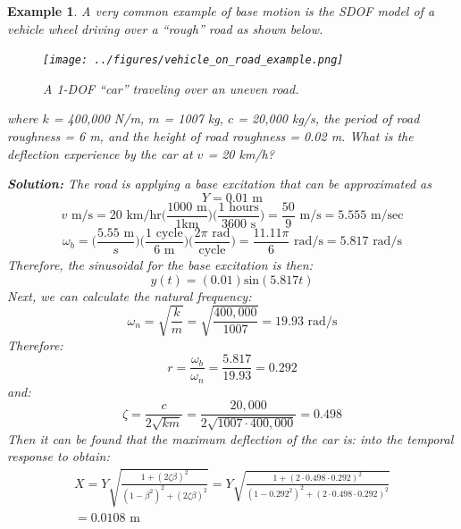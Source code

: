 \documentclass[12pt,letter]{article}
\newtheorem{ex}{Example}
\numberwithin{ex}{section} %
\newenvironment{example}{\begin{mdframed}[middlelinewidth=0.5mm]\begin{ex}\normalfont}{\end{ex}\end{mdframed}}
\numberwithin{re}{section} %
\numberwithin{pr}{section} %
\begin{document}
				\begin{example}
	
					A very common example of base motion is the SDOF model of a vehicle wheel driving over a ``rough'' road as shown below. 
					\begin{figure}[H]
						\centering
						\texttt{[image: ../figures/vehicle\_on\_road\_example.png]}
						\caption{A 1-DOF ``car'' traveling over an uneven road.}
					\end{figure}				
					\noindent where $k$ = 400,000 N/m, $m$ = 1007 kg, $c$ = 20,000 kg/s, the period of road roughness = 6 m, and the height of road roughness = 0.02 m. What is the deflection experience by the car at $v$ = 20 km/h?
					
					\noindent\textbf{Solution:} The road is applying a base excitation that can be approximated as 
					\begin{equation}
						Y = 0.01 \text{ m}
					\end{equation} 				
					\begin{equation}
						v \text{ m/s} = 20 \text{ km/hr}\Bigg(\frac{1000 \text{ m}}{1 \text {km}}\Bigg) \Bigg(\frac{1 \text{ hours}}{3600 \text { s}}\Bigg) = \frac{50}{9} \text{ m/s} = 5.555 \text{ m/sec}
					\end{equation} 	
					\begin{equation}
						\omega_b = \Bigg(\frac{ 5.55 \text{ m}}{s}\Bigg) \Bigg(\frac{ 1 \text{ cycle}}{6 \text{ m}}\Bigg) \Bigg(\frac{ 2 \pi \text{ rad}}{\text {cycle}}\Bigg) = \frac{ 11.11 \pi }{6 } \text{ rad/s} =5.817 \text{ rad/s} 
					\end{equation} 	
					Therefore, the sinusoidal for the base excitation is then:
					\begin{equation}
						y(t) = (0.01) \text{sin}(5.817 t)
					\end{equation} 	
					Next, we can calculate the natural frequency:
					\begin{equation}
						\omega_n = \sqrt{\frac{k}{m}} = \sqrt{\frac{400,000}{1007}} = 19.93 \text{ rad/s}
					\end{equation} 			
					Therefore:
					\begin{equation}
					r=\frac{\omega_b}{\omega_n} = \frac{5.817}{19.93} =0.292
					\end{equation} 		
					and:
					\begin{equation}
					\zeta = \frac{c}{2\sqrt{km}}= \frac{20,000}{2\sqrt{1007\cdot400,000}} = 0.498
					\end{equation}	
					Then it can be found that the maximum deflection of the car is:
					into the temporal response to obtain:
					\begin{equation}
					\begin{split}
					X = Y \sqrt{\frac{1+(2 \zeta \beta)^2}{(1-\beta^2)^2 + (2 \zeta \beta )^2}} = Y \sqrt{\frac{1+(2 \cdot 0.498 \cdot 0.292)^2}{(1-0.292^2)^2 + (2 \cdot 0.498 \cdot 0.292 )^2}}  \\ = 0.0108 \text{ m}
					\end{split}
					\end{equation} 		
				\end{example}	
					
\end{document}
